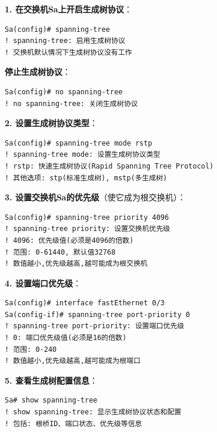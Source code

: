 \documentclass[12pt,a4paper]{ctexart}
\begin{document}
\begin{cmdbox}
\textbf{1. 在交换机Sa上开启生成树协议}：
\begin{lstlisting}
Sa(config)# spanning-tree
! spanning-tree: 启用生成树协议
! 交换机默认情况下生成树协议没有工作
\end{lstlisting}

\textbf{停止生成树协议}：
\begin{lstlisting}
Sa(config)# no spanning-tree
! no spanning-tree: 关闭生成树协议
\end{lstlisting}

\textbf{2. 设置生成树协议类型}：
\begin{lstlisting}
Sa(config)# spanning-tree mode rstp
! spanning-tree mode: 设置生成树协议类型
! rstp: 快速生成树协议(Rapid Spanning Tree Protocol)
! 其他选项: stp(标准生成树), mstp(多生成树)
\end{lstlisting}

\textbf{3. 设置交换机Sa的优先级}（使它成为根交换机）：
\begin{lstlisting}
Sa(config)# spanning-tree priority 4096
! spanning-tree priority: 设置交换机优先级
! 4096: 优先级值(必须是4096的倍数)
! 范围: 0-61440, 默认值32768
! 数值越小,优先级越高,越可能成为根交换机
\end{lstlisting}

\textbf{4. 设置端口优先级}：
\begin{lstlisting}
Sa(config)# interface fastEthernet 0/3
Sa(config-if)# spanning-tree port-priority 0
! spanning-tree port-priority: 设置端口优先级
! 0: 端口优先级值(必须是16的倍数)
! 范围: 0-240
! 数值越小,优先级越高,越可能成为根端口
\end{lstlisting}

\textbf{5. 查看生成树配置信息}：
\begin{lstlisting}
Sa# show spanning-tree
! show spanning-tree: 显示生成树协议状态和配置
! 包括: 根桥ID、端口状态、优先级等信息
\end{lstlisting}
\end{cmdbox}
\end{document}

